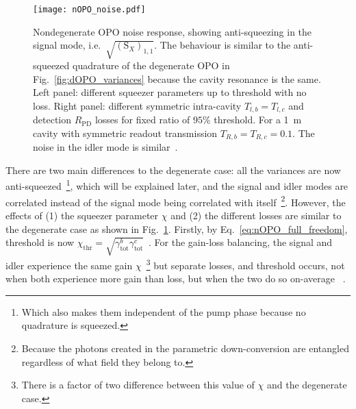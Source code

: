 \begin{figure}
	\centering
	\texttt{[image: nOPO\_noise.pdf]}
	\caption{Nondegenerate OPO noise response, showing anti-squeezing in the signal mode, i.e.\ $\sqrt{(\text{S}_X)_{1,1}}$. The behaviour is similar to the anti-squeezed quadrature of the degenerate OPO in Fig.~\ref{fig:dOPO_variances} because the cavity resonance is the same. Left panel: different squeezer parameters up to threshold with no loss. Right panel: different symmetric intra-cavity $T_{l,b}=T_{l,c}$ and detection $R_\text{PD}$ losses for fixed ratio of $95\%$ threshold. For a 1~m cavity with symmetric readout transmission $T_{R,b}=T_{R,c}=0.1$. The noise in the idler mode is similar~\cite{}.}
	\label{fig:nOPO_variances}
\end{figure}

There are two main differences to the degenerate case: all the variances are now anti-squeezed~\footnote{Which also makes them independent of the pump phase because no quadrature is squeezed.}, which will be explained later, and the signal and idler modes are correlated instead of the signal mode being correlated with itself~\footnote{Because the photons created in the parametric down-conversion are entangled regardless of what field they belong to.}.
However, the effects of (1) the squeezer parameter $\chi$ and (2) the different losses are similar to the degenerate case as shown in Fig.~\ref{fig:nOPO_variances}. 
Firstly, by Eq.~\ref{eq:nOPO_full_freedom}, threshold is now $\chi_\text{thr}=\sqrt{\gamma^b_\text{tot}\gamma^c_\text{tot}}$~\cite{}. %
For the gain-loss balancing, the signal and idler experience the same gain $\chi$~\footnote{There is a factor of two difference between this value of $\chi$ and the degenerate case.} but separate losses, and threshold occurs, not when both experience more gain than loss, but when the two do so on-average~\cite{} . %
